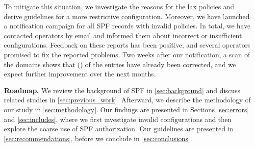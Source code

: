 To mitigate this situation, we investigate the reasons for the lax policies and derive guidelines for a more restrictive configuration. Moreover, we have launched a notification campaign for all SPF records with invalid policies. In total, we have contacted \numprint{\NotificationsCount} operators by email and informed them about incorrect or insufficient configurations. Feedback on these reports has been positive, and several operators promised to fix the reported problems.
Two weeks after our notification, a scan of the domains shows that \numprint{\SPFRescanResolvedErrors} (\NotificationSuccess) of the entries have already been corrected, and we expect further improvement over the next months. 

\smallskip
\textbf{Roadmap.} We review the background of SPF in \autoref{sec:background} and discuss related studies in \autoref{sec:previous_work}.
Afterward, we describe the methodology of our study in \autoref{sec:methodology}.
Our findings are presented in Sections \ref{sec:errors} and \ref{sec:includes}, where we first investigate invalid configurations and then explore the coarse use of SPF authorization.
Our guidelines are presented in \autoref{sec:recommendations}, before we conclude in \autoref{sec:conclusions}.
